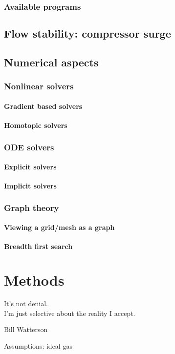 \documentclass[tcc]{subfiles}
\begin{document}
\subsection{Available programs}
\section{Flow stability: compressor surge}
\section{Numerical aspects}
\subsection{Nonlinear solvers}
\subsubsection{Gradient based solvers}
\subsubsection{Homotopic solvers}
\subsection{\ac{ODE} solvers}
\subsubsection{Explicit solvers}
\subsubsection{Implicit solvers}
\subsection{Graph theory}
\subsubsection{Viewing a grid/mesh as a graph}
\subsubsection{Breadth first search}

\chapter{Methods}
\label{sec:methods}
\epigraph{It's not denial. \\ I'm just selective about the reality I accept.}{Bill Watterson}
Assumptions: ideal gas
\end{document}
